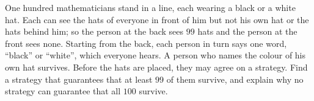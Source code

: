 One hundred mathematicians stand in a line, each wearing a black or a white hat. Each can see the hats of everyone in front of him but not his own hat or the hats behind him; so the person at the back sees $99$ hats and the person at the front sees none. Starting from the back, each person in turn says one word, ``black'' or ``white'', which everyone hears. A person who names the colour of his own hat survives. Before the hats are placed, they may agree on a strategy. Find a strategy that guarantees that at least $99$ of them survive, and explain why no strategy can guarantee that all $100$ survive.
